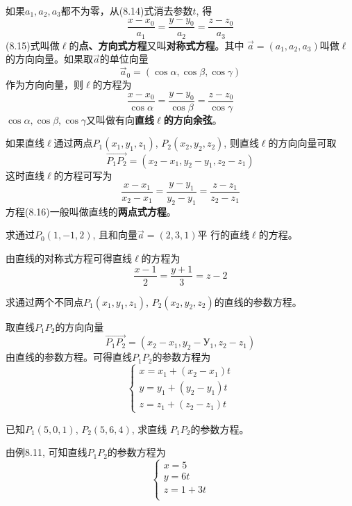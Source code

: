 如果$a_1,a_2,a_3$都不为零，从(8.14)式消去参数$t$, 得
\[\frac{x-x_0}{a_1}=\frac{y-y_0}{a_2}=\frac{z-z_0}{a_3}\]
(8.15)式叫做$\ell$的\textbf{点、方向式方程}又叫\textbf{对称式方程}。其中
$\vec{a}=(a_1,a_2,a_3)$叫做$\ell$的方向向量。如果取$\vec{a}$的单位向量
\[\vec{a}_0=(\cos\alpha, \cos\beta,\cos\gamma)\]
作为方向向量，则$\ell$的方程为
\[\frac{x-x_0}{\cos\alpha}=\frac{y-y_0}{\cos\beta}=\frac{z-z_0}{\cos\gamma}\]
$\cos\alpha, \cos\beta,\cos\gamma$又叫做有向\textbf{直线$\ell$的方向余弦}。

如果直线$\ell$通过两点$P_1(x_1,y_1,z_1)$, $P_2(x_2,y_2,z_2)$, 
则直线$\ell$的方向向量可取
\[\Vec{P_1P_2}=(x_2-x_1,y_2-y_1,z_2-z_1)\]
这时直线$\ell$的方程可写为
\begin{equation}
    \frac{x-x_1}{x_2-x_1}=\frac{y-y_1}{y_2-y_1}=\frac{z-z_1}{z_2-z_1}
\end{equation}
方程(8.16)一般叫做直线的\textbf{两点式方程}。



\begin{example}
    求通过$P_0(1,-1,2)$, 且和向量$\vec{a}=(2,3,1)$平
行的直线$\ell$的方程。
\end{example}


\begin{solution}
    由直线的对称式方程可得直线$\ell$的方程为
\[\frac{x-1}{2}=\frac{y+1}{3}=z-2\]
\end{solution}

\begin{example}
    求通过两个不同点$P_1(x_1,y_1,z_1)$, $P_2(x_2,
y_2,z_2)$的直线的参数方程。
\end{example}


\begin{solution}
    取直线$P_1P_2$的方向向量
\[    \Vec{P_1P_2}=(x_2-x_1, y_2-У_1,z_2-z_1)\]
    由直线的参数方程。可得直线$P_1P_2$的参数方程为
\[\begin{cases}
    x=x_1+(x_2-x_1)t\\
    y=y_1+(y_2-y_1)t\\
    z=z_1+(z_2-z_1)t
\end{cases}\]
\end{solution}    

\begin{example}
    已知$P_1(5,0,1)$, $P_2(5,6,4)$, 求直线
$P_1P_2$的参数方程。
\end{example}


\begin{solution}
    由例8.11, 可知直线$P_1P_2$的参数方程为
    \[\begin{cases}
     x=5\\
y=6t\\
z=1+3t\\
    \end{cases}\]
\end{solution}

